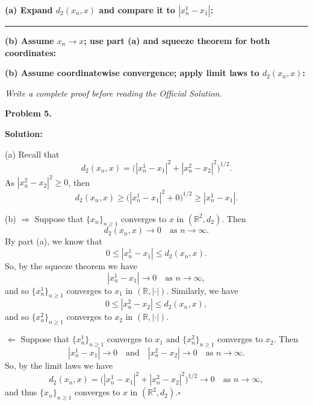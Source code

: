 \documentclass[12pt]{article}
\newcommand{\writespace}[1]{\vspace{#1}}
\begin{document}
\newpage

\begin{tcolorbox}[
  enhanced, breakable,
  colback  = pass4purple,
  colframe = purple!55!black,
  fonttitle = \bfseries,
  title = {Pass 4 \enspace\textbf{--}\enspace Skeleton Proof}
]
\noindent\textbf{(a) Expand $d_2(x_n,x)$ and compare it to $|x_n^1-x_1|$:}\par
\writespace{1.4cm}

\noindent\rule{\linewidth}{0.4pt}\vspace{2pt}

\noindent\textbf{(b) Assume $x_n\to x$; use part (a) and squeeze theorem for both coordinates:}\par
\writespace{1.8cm}
\noindent\textbf{(b) Assume coordinatewise convergence; apply limit laws to $d_2(x_n,x)$:}\par
\writespace{1.6cm}
\end{tcolorbox}

\newpage

\begin{tcolorbox}[
  enhanced, breakable,
  colback  = pass5gray,
  colframe = black!38,
  fonttitle = \bfseries,
  title = {Pass 5 \enspace\textbf{--}\enspace Full Proof Attempt}
]
\small\itshape Write a complete proof before reading the Official Solution.\par
\normalfont\normalsize
\writespace{19cm}
\end{tcolorbox}

\newpage

\begin{tcolorbox}[
  enhanced, breakable,
  colback  = solgreen,
  colframe = green!45!black,
  fonttitle = \bfseries,
  title = {\textsc{Official Solution}\hfill Homework 9 -- Solutions}
]
\textbf{Problem 5.}

\medskip\textbf{Solution:}

\medskip
(a) Recall that
\[
  d_2(x_n, x) = \bigl(|x_n^1-x_1|^2 + |x_n^2-x_2|^2\bigr)^{1/2}.
\]
As $|x_n^2-x_2|^2 \ge 0$, then
\[
  d_2(x_n, x) \ge \bigl(|x_n^1-x_1|^2 + 0\bigr)^{1/2} \ge |x_n^1-x_1|.
\]

\medskip
(b) $\Longrightarrow$ Suppose that $\{x_n\}_{n\ge1}$ converges to $x$ in $(\mathbb{R}^2, d_2)$. Then
\[
  d_2(x_n, x) \to 0 \quad \text{as } n \to \infty.
\]
By part (a), we know that
\[
  0 \le |x_n^1-x_1| \le d_2(x_n, x).
\]
So, by the squeeze theorem we have
\[
  |x_n^1-x_1| \to 0 \quad \text{as } n \to \infty,
\]
and so $\{x_n^1\}_{n\ge1}$ converges to $x_1$ in $(\mathbb{R}, |\cdot|)$. Similarly, we have
\[
  0 \le |x_n^2-x_2| \le d_2(x_n, x),
\]
and so $\{x_n^2\}_{n\ge1}$ converges to $x_2$ in $(\mathbb{R}, |\cdot|)$.

\medskip
$\Longleftarrow$ Suppose that $\{x_n^1\}_{n\ge1}$ converges to $x_1$ and $\{x_n^2\}_{n\ge1}$ converges to $x_2$. Then
\[
  |x_n^1-x_1| \to 0 \quad \text{and} \quad |x_n^2-x_2| \to 0 \quad \text{as } n \to \infty.
\]
So, by the limit laws we have
\[
  d_2(x_n, x) = \bigl(|x_n^1-x_1|^2 + |x_n^2-x_2|^2\bigr)^{1/2} \to 0 \quad \text{as } n \to \infty,
\]
and thus $\{x_n\}_{n\ge1}$ converges to $x$ in $(\mathbb{R}^2, d_2)$.\hfill$\square$
\end{tcolorbox}
\end{document}
